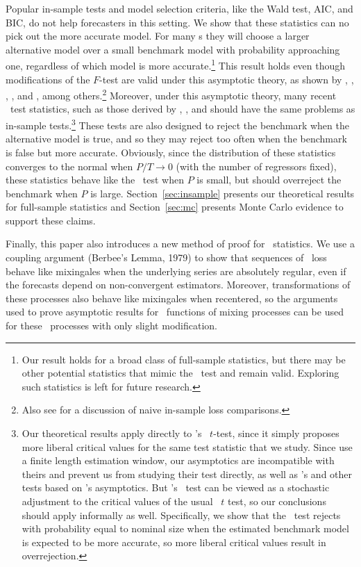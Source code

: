 \documentclass[11pt]{article}
\newcommand{\citepos}[1]{\citeauthor{#1}'s \citeyearpar{#1}}
\newcommand{\clws}{\citeauthor{ClW:06}'s \citeyearpar{ClW:06,ClW:07}}
\begin{document}
Popular in-sample tests and model selection criteria, like the Wald
test, AIC, and BIC, do not help forecasters in this setting. We show
that these statistics can no pick out the more accurate model. For
many \dgp s they will choose a larger alternative model over a small
benchmark model with probability approaching one, regardless of which
model is more accurate.\footnote{Our result holds for a broad class of
  full-sample statistics, but there may be other potential statistics
  that mimic the \oos\ test and remain valid. Exploring such
  statistics is left for future research.}
This result holds even though modifications of the $F$-test are valid
under this asymptotic theory, as shown by \citet{BoB:95},
\citet{AkA:00}, \citet{AkP:04}, \citet{Cal:11c}, and \citet{Ana:12},
among others.\footnote{Also see \citet{Efr:86,Efr:04} for a discussion
  of naive in-sample loss comparisons.}
Moreover, under this asymptotic theory, many recent \oos\ test
statistics, such as those derived by \cite{ClM:01,ClM:05},
\citet{Mcc:07}, and \citet{ClW:06,ClW:07} should have the same
problems as in-sample tests.\footnote{Our theoretical results apply
  directly to \citepos{Mcc:07} \oos\ $t$-test, since it simply
  proposes more liberal critical values for the same test statistic
  that we study.  Since \citet{ClW:06,ClW:07} use a finite length
  estimation window, our asymptotics are incompatible with theirs and
  prevent us from studying their test directly, as well as
  \citepos{GiW:06} and other tests based on \citepos{GiW:06}
  asymptotics.  But \clws\ test can be viewed as a stochastic
  adjustment to the critical values of the usual \oos\ $t$ test, so
  our conclusions should apply informally as well.  Specifically, we
  show that the \dmw\ test rejects with probability equal to nominal
  size when the estimated benchmark model is expected to be more
  accurate, so more liberal critical values result in overrejection.}
These tests are also designed to reject the benchmark when the
alternative model is true, and so they may reject too often when the
benchmark is false but more accurate.  Obviously, since the
distribution of these statistics converges to the normal when $P/T \to
0$ (with the number of regressors fixed), these statistics behave like
the \dmw\ test when $P$ is small, but should overreject the benchmark
when $P$ is large. Section~\ref{sec:insample} presents our theoretical
results for full-sample statistics and Section~\ref{sec:mc} presents
Monte Carlo evidence to support these claims.

Finally, this paper also introduces a new method of proof for \oos\
statistics.  We use a coupling argument (Berbee's Lemma, 1979) to show
that sequences of \oos\ loss behave like mixingales when the
underlying series are absolutely regular, even if the forecasts depend
on non-convergent estimators.  Moreover, transformations of these
processes also behave like mixingales when recentered, so 
the arguments used to prove asymptotic
results for \ned\ functions of mixing processes can be used for these
\oos\ processes with only slight modification.
\end{document}
